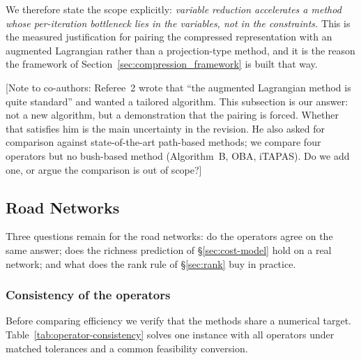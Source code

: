 \documentclass[11pt]{article}
\newif\ifshownotes \shownotestrue
\newcommand{\conote}[1]{\ifshownotes{\color{red}\small\textsf{[Note to co-authors: #1]}}\fi}
\begin{document}
We therefore state the scope explicitly: \emph{variable reduction accelerates a method whose
per-iteration bottleneck lies in the variables, not in the constraints.} This is the
measured justification for pairing the compressed representation with an augmented Lagrangian
rather than a projection-type method, and it is the reason the framework of
Section~\ref{sec:compression_framework} is built that way.

\conote{Referee~2 wrote that ``the augmented Lagrangian method is quite standard'' and wanted
a tailored algorithm. This subsection is our answer: not a new algorithm, but a demonstration
that the pairing is forced. Whether that satisfies him is the main uncertainty in the
revision. He also asked for comparison against state-of-the-art path-based methods; we compare
four operators but no bush-based method (Algorithm~B, OBA, iTAPAS). Do we add one, or argue
the comparison is out of scope?}


\subsection{Road Networks}
\label{sec:road-networks}


Three questions remain for the road networks: do the operators agree on the same answer; does
the richness prediction of \S\ref{sec:cost-model} hold on a real network; and what does the
rank rule of \S\ref{sec:rank} buy in practice.


\subsubsection*{Consistency of the operators}


Before comparing efficiency we verify that the methods share a numerical target.
Table~\ref{tab:operator-consistency} solves one instance with all operators under matched
tolerances and a common feasibility conversion.
\end{document}
